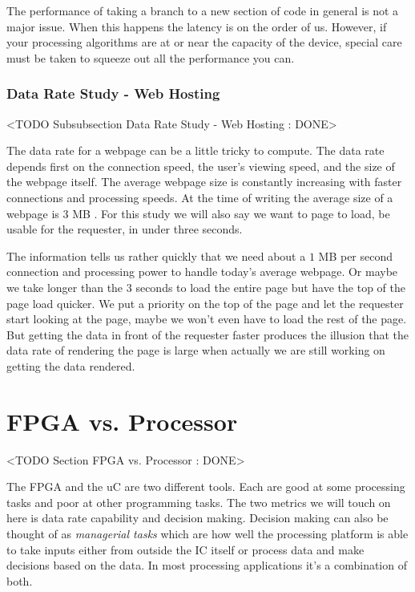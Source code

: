 The performance of taking a branch to a new section of code in general is not a major issue. When this happens the latency is on the order of \ac{us}. However, if your processing algorithms are at or near the capacity of the device, special care must be taken to squeeze out all the performance you can.
	
\subsubsection{Data Rate Study - Web Hosting}
	<TODO Subsubsection  Data Rate Study - Web Hosting : DONE>

The data rate for a webpage can be a little tricky to compute. The data rate depends first on the connection speed, the user's viewing speed, and the size of the webpage itself. The average webpage size is constantly increasing with faster connections and processing speeds. At the time of writing the average size of a webpage is $3$ \ac{MB} \cite{AvgWebSize}. For this study we will also say we want to page to load, be usable for the requester, in under three seconds.

The information tells us rather quickly that we need about a $1$ \ac{MB} per second connection and processing power to handle today's average webpage. Or maybe we take longer than the $3$ seconds to load the entire page but have the top of the page load quicker. We put a priority on the top of the page and let the requester start looking at the page, maybe we won't even have to load the rest of the page. But getting the data in front of the requester faster produces the illusion that the data rate of rendering the page is large when actually we are still working on getting the data rendered. 
	
\section{FPGA vs. Processor}
	<TODO Section FPGA vs. Processor : DONE>

The \ac{FPGA} and the \ac{uC} are two different tools. Each are good at some processing tasks and poor at other programming tasks. The two metrics we will touch on here is data rate capability and decision making. Decision making can also be thought of as \emph{managerial tasks} which are how well the processing platform is able to take inputs either from outside the \ac{IC} itself or process data and make decisions based on the data. In most processing applications it's a combination of both.
	
